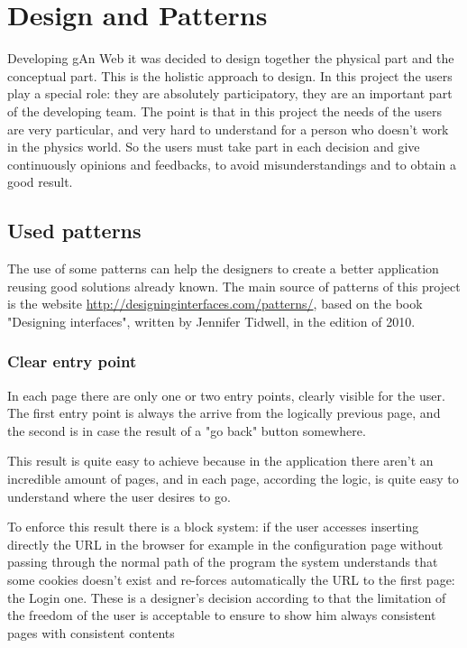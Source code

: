 
\chapter{Design and Patterns} %

\label{Chapter7} %

Developing gAn Web it was decided to design together the physical part and the conceptual part. This is the holistic approach to design. In this project the users play a special role: they are absolutely participatory, they are an important part of the developing team.
The point is that in this project the needs of the users are very particular, and very hard to understand for a person who doesn't work in the physics world. So the users must take part in each decision and give continuously opinions and feedbacks, to avoid misunderstandings and to obtain a good result.

\section{Used patterns}

The use of some patterns can help the designers to create a better application reusing good solutions already known.
The main source of patterns of this project is the website \url{http://designinginterfaces.com/patterns/}, based on the book "Designing interfaces", written by Jennifer Tidwell, in the edition of 2010.

\subsection{Clear entry point} 

In each page there are only one or two entry points, clearly visible for the user.
The first entry point is always the arrive from the logically previous page, and the second is in case the result of a "go back" button somewhere.

This result is quite easy to achieve because in the application there aren't an incredible amount of pages, and in each page, according the logic, is quite easy to understand where the user desires to go. 

To enforce this result there is a block system: if the user accesses inserting directly the URL in the browser for example in the configuration page without passing through the normal path of the program the system understands that some cookies doesn't exist and re-forces automatically the URL to the first page: the Login one. These is a designer's decision according to that the limitation of the freedom of the user is acceptable to ensure to show him always consistent pages with consistent contents

